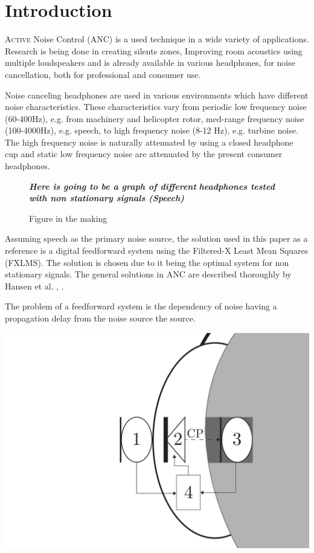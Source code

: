 \section{Introduction}
\lettrine[lines=2]{A}{ctive} Noise Control (ANC) is a used technique in a wide variety of applications. Research is being done in creating silents zones\cite{SilentZones}, Improving room acoustics using multiple loudspeakers\cite{CAPS} and is already available in various headphones, for noise cancellation, both for professional and consumer use. 

Noise canceling headphones are used in various environments which have different noise characteristics. These characteristics vary from periodic low frequency noise (60-400Hz), e.g. from machinery and helicopter rotor\cite{LowFrequency}, med-range frequency noise (100-4000Hz), e.g. speech\cite{MidFrequency}, to high frequency noise (8-12 Hz), e.g. turbine noise\cite{LowFrequency}. The high frequency noise is naturally attenuated by using a closed headphone cup\cite{naturalAttenuation} and static low frequency noise are attenuated by the present consumer headphones\cite{ConsumerANC}.

\begin{figure}[H]
	\centering
	\textbf{\textit{Here is going to be a graph of different}}
	\textbf{\textit{ headphones tested with non stationary signals (Speech)}}
	\caption{Figure in the making}
\end{figure}


Assuming speech as the primary noise source, the solution used in this paper as a reference is a digital feedforward system using the Filtered-X Least Mean Squares (FXLMS). The solution is chosen due to it being the optimal system for non stationary signals. The general solutions in ANC are described thoroughly by Hansen et al. \cite{Hansen2}, \cite{Hansen}.

The problem of a feedforward system is the dependency of noise having a propagation delay from the noise source the source. 

{
	\centering
	\includegraphics[width=0.5\columnwidth]{figures/ArticleIllustrations/BasicOverviewZoomed}
	\label{fig:SystemOverview}
}

